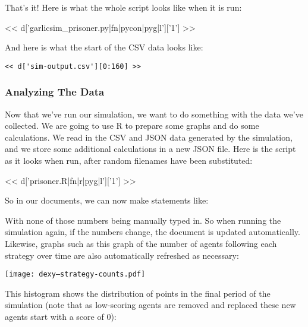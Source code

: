 \documentclass[custom, plainsections]{sciposter}
\begin{document}
\begin{multicols*}{2}
\vspace{0.5cm}
That's it! Here is what the whole script looks like when it is run:
\vspace{0.5cm}

\tiny
<< d['garlicsim_prisoner.py|fn|pycon|pyg|l']['1'] >>
\small

And here is what the start of the CSV data looks like:

\begin{Verbatim}
<< d['sim-output.csv'][0:160] >>
\end{Verbatim}

\subsubsection*{Analyzing The Data}

Now that we've run our simulation, we want to do something with the data we've collected. We are going to use R to prepare some graphs and do some calculations. We read in the CSV and JSON data generated by the simulation, and we store some additional calculations in a new JSON file. Here is the script as it looks when run, after random filenames have been substituted:

\tiny
<< d['prisoner.R|fn|r|pyg|l']['1'] >>
\small

So in our documents, we can now make statements like:

\vspace{0.5cm}

\vspace{0.5cm}

With none of those numbers being manually typed in. So when running the simulation again, if the numbers change, the document is updated automatically. Likewise, graphs such as this graph of the number of agents following each strategy over time are also automatically refreshed as necessary:

\texttt{[image: dexy--strategy-counts.pdf]}

This histogram shows the distribution of points in the final period of the simulation (note that as low-scoring agents are removed and replaced these new agents start with a score of 0):


\end{multicols*}
\end{document}
